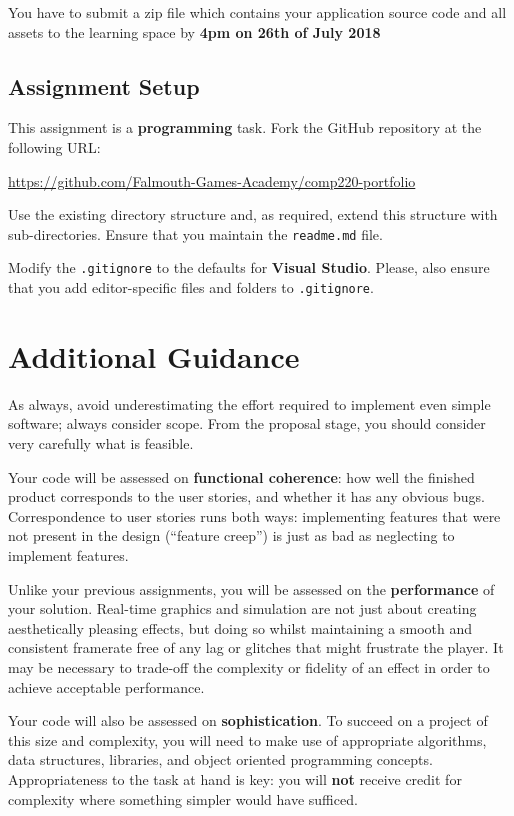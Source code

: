 \documentclass{../../fal_assignment}
\begin{document}
You have to submit a zip file which contains your application source code and all assets to the learning space by \textbf{4pm on 26th of July 2018}

\subsection*{Assignment Setup}

This assignment is a \textbf{programming} task. Fork the GitHub repository at the following URL:

\indent \url{https://github.com/Falmouth-Games-Academy/comp220-portfolio}

Use the existing directory structure and, as required, extend this structure with sub-directories.
Ensure that you maintain the \texttt{readme.md} file.

Modify the \texttt{.gitignore} to the defaults for \textbf{Visual Studio}.
Please, also ensure that you add editor-specific files and folders to \texttt{.gitignore}. 

\section*{Additional Guidance}

As always, avoid underestimating the effort required to implement even simple software; always consider scope.
From the proposal stage, you should consider very carefully what is feasible.

Your code will be assessed on \textbf{functional coherence}:
how well the finished product corresponds to the user stories,
and whether it has any obvious bugs.
Correspondence to user stories runs both ways:
implementing features that were not present in the design (``feature creep'')
is just as bad as neglecting to implement features.

Unlike your previous assignments,
you will be assessed on the \textbf{performance} of your solution.
Real-time graphics and simulation are not just about creating aesthetically pleasing effects,
but doing so whilst maintaining a smooth and consistent framerate free of any lag or glitches that might frustrate the player.
It may be necessary to trade-off the complexity or fidelity of an effect
in order to achieve acceptable performance.

Your code will also be assessed on \textbf{sophistication}.
To succeed on a project of this size and complexity,
you will need to make use of appropriate algorithms, data structures, libraries, and object oriented programming concepts.
Appropriateness to the task at hand is key:
you will \textbf{not} receive credit for complexity  
where something simpler would have sufficed.
\end{document}

